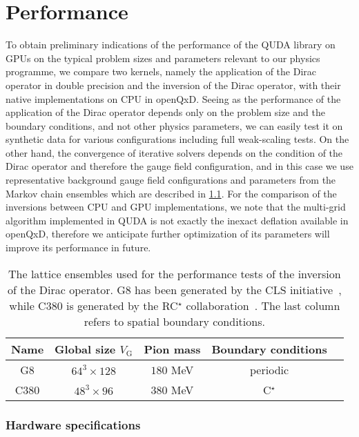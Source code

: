 \chapter{Performance}
\label{ch:p1:performance}

To obtain preliminary indications of the performance of the QUDA library on GPUs on the typical problem sizes and parameters relevant to our physics programme, we compare two kernels, namely the application of the Dirac operator in double precision and the inversion of the Dirac operator, with their native implementations on CPU in openQxD.
Seeing as the performance of the application of the Dirac operator depends only on the problem size and the boundary conditions, and not other physics parameters, we can easily test it on synthetic data for various configurations including full weak-scaling tests.
On the other hand, the convergence of iterative solvers depends on the condition of the Dirac operator and therefore the gauge field configuration, and in this case we use representative background gauge field configurations and parameters from the Markov chain ensembles which are described in \cref{tab:ensembles}.
For the comparison of the inversions between CPU and GPU implementations, we note that the multi-grid algorithm implemented in QUDA is not exactly the inexact deflation available in openQxD, therefore we anticipate further optimization of its parameters will improve its performance in future.

\begin{table}[h]
\centering
\begin{tabular}{ccccc}
Name & Global size $V_\mathrm{G}$ & Pion mass & Boundary conditions \\
\hline
G8   & $64^3 \times 128$ & $180$ MeV & periodic \\
C380 & $48^3 \times 96$  & $380$ MeV & C$^\star$ \\
\end{tabular}
\caption{The lattice ensembles used for the performance tests of the inversion of the Dirac operator. G8 has been generated by the CLS initiative~\cite{online:cls}, while C380 is generated by the RC$^\star$ collaboration~\cite{RCstar22}. The last column refers to spatial boundary conditions.}
\label{tab:ensembles}
\end{table}

\subsection{Hardware specifications}
\label{sec:hardware}

